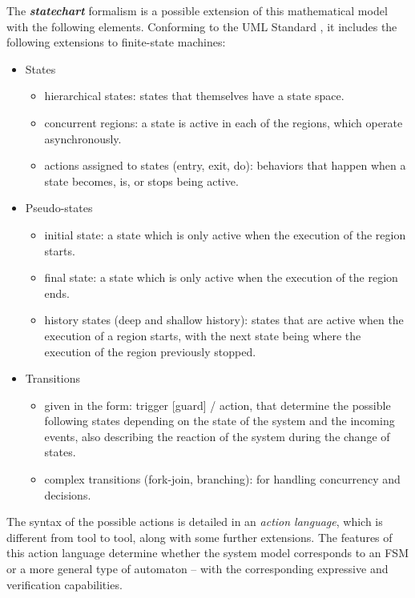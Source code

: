The \textbf{\textit{statechart}} \cite{HarelStatechart87} formalism is a possible extension of this mathematical model with the following elements. Conforming to the UML Standard \cite{UMLStandard251}, it includes the following extensions to finite-state machines:	
\begin{itemize}
		\item States
		\begin{itemize}
			\item hierarchical states: states that themselves have a state space.
			\item concurrent regions: a state is active in each of the regions, which operate asynchronously.
			\item actions assigned to states (entry, exit, do): behaviors that happen when a state becomes, is, or stops being active.
		\end{itemize}
	\item Pseudo-states
		\begin{itemize}
			\item initial state: a state which is only active when the execution of the region starts.
			\item final state: a state which is only active when the execution of the region ends.
			\item history states (deep and shallow history): states that are active when the execution of a region starts, with the next state being where the execution of the region previously stopped.
		\end{itemize}
	\item Transitions
		\begin{itemize}
			\item given in the form: trigger [guard] / action, that determine the possible following states depending on the state of the system and the incoming events, also describing the reaction of the system during the change of states.
			\item complex transitions (fork-join, branching): for handling concurrency and decisions. 
		\end{itemize}
	\end{itemize}
The syntax of the possible actions is detailed in an \textit{action language}, which is different from tool to tool, along with some further extensions. The features of this action language determine whether the system model corresponds to an FSM or a more general type of automaton -- with the corresponding expressive and verification capabilities.

